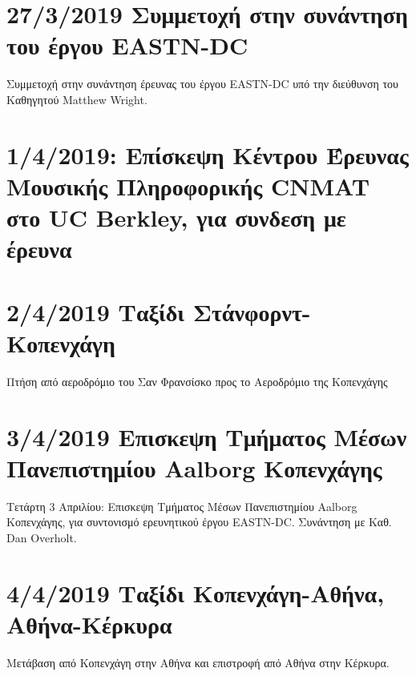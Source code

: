 \section{27/3/2019 Συμμετοχή στην συνάντηση του έργου EASTN-DC}
\label{sec:org03b380c}
Συμμετοχή στην συνάντηση έρευνας του έργου EASTN-DC υπό την διεύθυνση του Καθηγητού Matthew Wright.
\section{1/4/2019: Επίσκεψη Κέντρου Έρευνας Μουσικής Πληροφορικής CNMAT στο UC Berkley, για συνδεση με έρευνα}
\label{sec:org8735b39}
\section{2/4/2019  Ταξίδι Στάνφορντ-Κοπενχάγη}
\label{sec:org4f818f6}

Πτήση από αεροδρόμιο του Σαν Φρανσίσκο προς το Αεροδρόμιο της Κοπενχάγης

\section{3/4/2019 Επισκεψη Τμήματος Μέσων Πανεπιστημίου Aalborg Κοπενχάγης}
\label{sec:org423babc}

Τετάρτη 3 Απριλίου: Επισκεψη Τμήματος Μέσων Πανεπιστημίου Aalborg Κοπενχάγης, για συντονισμό ερευνητικού έργου EASTN-DC.  Συνάντηση με Καθ. Dan Overholt.

\section{4/4/2019 Ταξίδι Κοπενχάγη-Αθήνα, Αθήνα-Κέρκυρα}
\label{sec:org9a13eee}

Μετάβαση από Κοπενχάγη στην Αθήνα και επιστροφή από Αθήνα στην Κέρκυρα.
